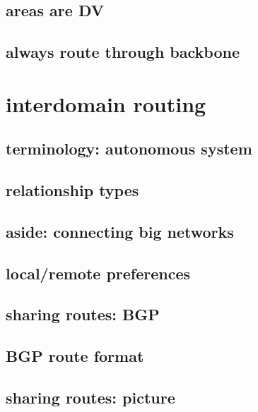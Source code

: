 

\subsection{areas are DV}



\subsection{always route through backbone}


\section{interdomain routing}


\subsection{terminology: autonomous system}


\subsection{relationship types}


\subsection{aside: connecting big networks}


\subsection{local/remote preferences}


\subsection{sharing routes: BGP}


\subsection{BGP route format}


\subsection{sharing routes: picture}


